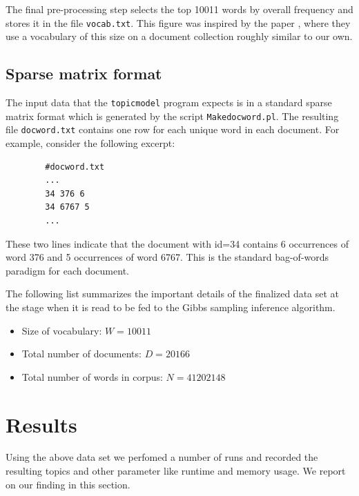 \documentclass[11pt]{article}
\newcommand{\file}[1]{\texttt{#1}}
\newcommand{\program}[1]{\texttt{#1}}
\begin{document}
        The final pre-processing step selects the top 10011 words by overall frequency 
        and stores it in the file \file{vocab.txt}.
        This figure was inspired by the paper \cite{Blei2009}, where they use a vocabulary of this
        size on a document collection roughly similar to our own.


    \subsection{Sparse matrix format}

        The input data that the \program{topicmodel} program expects is in a standard sparse 
        matrix format which is generated by the script \program{Makedocword.pl}.
        The resulting file \file{docword.txt} contains one row for each unique word
        in each document. For example, consider the following excerpt:
        \begin{verbatim}
        #docword.txt
        ...
        34 376 6
        34 6767 5
        ...
        \end{verbatim}
        These two lines indicate that the document with id=34 contains 6 occurrences of word 376
        and 5 occurrences of word 6767.
        This is the standard bag-of-words paradigm for each document.


    The following list summarizes the important details of the finalized data set 
    at the stage when it is read to be fed to the Gibbs sampling inference algorithm.
	\begin{itemize}
        \item Size of vocabulary: $W=10011$  
        \item Total number of documents: $D=20166$ 
        \item Total number of words in corpus: $N=41202148$
	\end{itemize}



\section{Results} \label{section:results}


    Using the above data set we perfomed a number of runs and recorded the resulting
    topics and other parameter like runtime and memory usage. 
    We report on our finding in this section.
\end{document}
